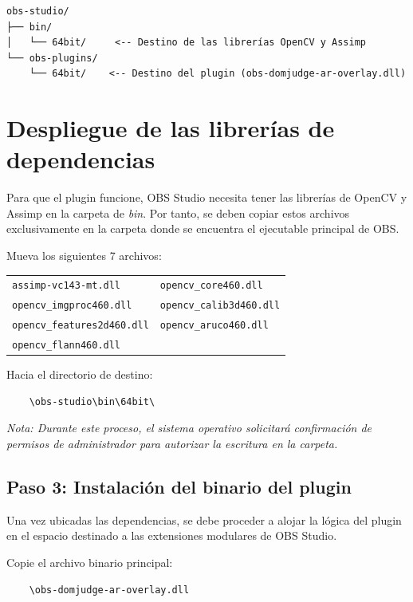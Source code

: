 \begin{verbatim}
obs-studio/
├── bin/
│   └── 64bit/     <-- Destino de las librerías OpenCV y Assimp
└── obs-plugins/
    └── 64bit/    <-- Destino del plugin (obs-domjudge-ar-overlay.dll)
\end{verbatim}

\section{Despliegue de las librerías de dependencias}

Para que el plugin funcione, OBS Studio necesita tener las librerías de OpenCV y Assimp en la carpeta de \textit{bin}. Por tanto, se deben copiar estos archivos exclusivamente en la carpeta donde se encuentra el ejecutable principal de OBS.

Mueva los siguientes 7 archivos:
\begin{center}
\begin{tabular}{l l}
    \texttt{assimp-vc143-mt.dll} & \texttt{opencv\_core460.dll} \\
    \texttt{opencv\_imgproc460.dll} & \texttt{opencv\_calib3d460.dll} \\
    \texttt{opencv\_features2d460.dll} & \texttt{opencv\_aruco460.dll} \\
    \texttt{opencv\_flann460.dll} & 
\end{tabular}
\end{center}

Hacia el directorio de destino:
\begin{verbatim}
    \obs-studio\bin\64bit\
\end{verbatim}

\textit{Nota: Durante este proceso, el sistema operativo solicitará confirmación de permisos de administrador para autorizar la escritura en la carpeta.}

\subsection{Paso 3: Instalación del binario del plugin}

Una vez ubicadas las dependencias, se debe proceder a alojar la lógica del plugin en el espacio destinado a las extensiones modulares de OBS Studio. 

Copie el archivo binario principal:
\begin{verbatim}
    \obs-domjudge-ar-overlay.dll
\end{verbatim}

